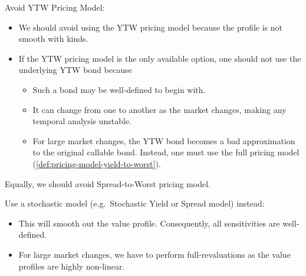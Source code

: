 \documentclass[10pt,a4paper]{article}
\begin{document}
Avoid YTW Pricing Model:
\begin{itemize}
	\item We should avoid using the YTW pricing model because the profile is not smooth with kinds.
	\item If the YTW pricing model is the only available option, one should not use the underlying YTW bond because
	\begin{itemize}
		\item Such a bond may be well-defined to begin with. 
		\item It can change from one to another as the market changes, making any temporal analysis unstable. 
		\item For large market changes, the YTW bond becomes a bad approximation to the original callable bond. Instead, one must use the full pricing model (\ref{def:pricing-model-yield-to-worst}). 
	\end{itemize}	
\end{itemize}
Equally, we should avoid Spread-to-Worst pricing model. 


Use a stochastic model (e.g.\ Stochastic Yield or Spread model) instead:
\begin{itemize}
	\item This will smooth out the value profile. Consequently, all sensitivities are well-defined. 
	\item For large market changes, we have to perform full-revaluations as the value profiles are highly non-linear.  
\end{itemize}
\end{document}
